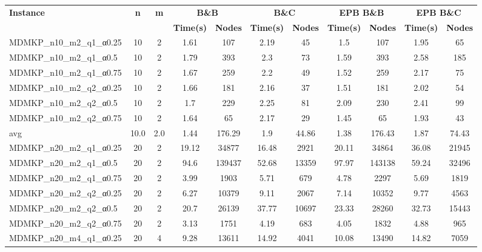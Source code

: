 \begin{table}[!ht]
\centering
\hspace*{-1cm}\begin{tabular}{lcccccccccc}
\toprule
\textbf{Instance} & \textbf{n} & \textbf{m} & \multicolumn{2}{c}{\textbf{B\&B}} & \multicolumn{2}{c}{\textbf{B\&C}}  & \multicolumn{2}{c}{\textbf{EPB B\&B}} & \multicolumn{2}{c}{\textbf{EPB B\&C}} \\

\cmidrule(r){4-5} \cmidrule(r){6-7} \cmidrule(r){8-9} \cmidrule(r){10-11} 
~ & ~ & ~ & \textbf{Time(s)} &\textbf{Nodes} & \textbf{Time(s)} &\textbf{Nodes} & \textbf{Time(s)} &\textbf{Nodes} & \textbf{Time(s)} &\textbf{Nodes}  \\
\midrule

MDMKP\_n10\_m2\_q1\_α0.25 & 10 & 2 & 1.61 & 107 & 2.19 & 45 & 1.5 & 107 & 1.95 & 65 \\
MDMKP\_n10\_m2\_q1\_α0.5 & 10 & 2 & 1.79 & 393 & 2.3 & 73 & 1.59 & 393 & 2.58 & 185 \\
MDMKP\_n10\_m2\_q1\_α0.75 & 10 & 2 & 1.67 & 259 & 2.2 & 49 & 1.52 & 259 & 2.17 & 75 \\
MDMKP\_n10\_m2\_q2\_α0.25 & 10 & 2 & 1.66 & 181 & 2.16 & 37 & 1.51 & 181 & 2.02 & 54 \\
MDMKP\_n10\_m2\_q2\_α0.5 & 10 & 2 & 1.7 & 229 & 2.25 & 81 & 2.09 & 230 & 2.41 & 99 \\
MDMKP\_n10\_m2\_q2\_α0.75 & 10 & 2 & 1.64 & 65 & 2.17 & 29 & 1.45 & 65 & 1.93 & 43 \\
\hline avg & 10.0 & 2.0 & 1.44& 176.29 & 1.9& 44.86 & 1.38& 176.43 & 1.87& 74.43\\ \hline
MDMKP\_n20\_m2\_q1\_α0.25 & 20 & 2 & 19.12 & 34877 & 16.48 & 2921 & 20.11 & 34864 & 36.08 & 21945 \\
MDMKP\_n20\_m2\_q1\_α0.5 & 20 & 2 & 94.6 & 139437 & 52.68 & 13359 & 97.97 & 143138 & 59.24 & 32496 \\
MDMKP\_n20\_m2\_q1\_α0.75 & 20 & 2 & 3.99 & 1903 & 5.71 & 679 & 4.78 & 2297 & 5.69 & 1819 \\
MDMKP\_n20\_m2\_q2\_α0.25 & 20 & 2 & 6.27 & 10379 & 9.11 & 2067 & 7.14 & 10352 & 9.77 & 4563 \\
MDMKP\_n20\_m2\_q2\_α0.5 & 20 & 2 & 20.7 & 26139 & 37.77 & 10697 & 23.33 & 28260 & 32.73 & 15443 \\
MDMKP\_n20\_m2\_q2\_α0.75 & 20 & 2 & 3.13 & 1751 & 4.19 & 683 & 4.05 & 1832 & 4.88 & 965 \\
MDMKP\_n20\_m4\_q1\_α0.25 & 20 & 4 & 9.28 & 13611 & 14.92 & 4041 & 10.08 & 13490 & 14.82 & 7059 \\

\end{tabular}
\end{table}
